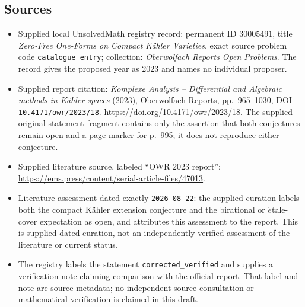 \documentclass[11pt]{article}
\begin{document}
\subsection{Sources}
\begin{itemize}
\item Supplied local UnsolvedMath registry record: permanent ID \(30005491\), title \emph{Zero-Free One-Forms on Compact K\"ahler Varieties}, exact source problem code \texttt{catalogue entry}; collection: \emph{Oberwolfach Reports Open Problems}. The record gives the proposed year as 2023 and names no individual proposer.
\item Supplied report citation: \emph{Komplexe Analysis -- Differential and Algebraic methods in K\"ahler spaces} (2023), Oberwolfach Reports, pp.\ 965--1030, DOI \texttt{10.4171/owr/2023/18}. \url{https://doi.org/10.4171/owr/2023/18}. The supplied original-statement fragment contains only the assertion that both conjectures remain open and a page marker for p.\ 995; it does not reproduce either conjecture.
\item Supplied literature source, labeled ``OWR 2023 report'': \url{https://ems.press/content/serial-article-files/47013}.
\item Literature assessment dated exactly \texttt{2026-08-22}: the supplied curation labels both the compact K\"ahler extension conjecture and the birational or \(\acute{e}\)tale-cover expectation as open, and attributes this assessment to the report. This is supplied dated curation, not an independently verified assessment of the literature or current status.
\item The registry labels the statement \texttt{corrected\_verified} and supplies a verification note claiming comparison with the official report. That label and note are source metadata; no independent source consultation or mathematical verification is claimed in this draft.
\end{itemize}
\end{document}
